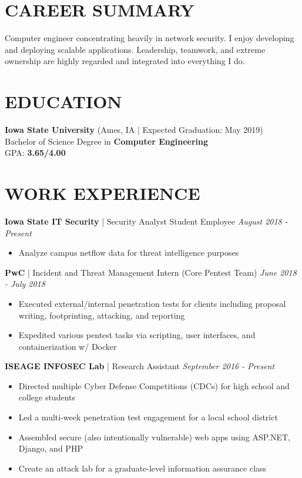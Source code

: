 \documentclass[line]{res}
\begin{document}
\address{(630) 450-0012\\dlimanow@iastate.edu\\Ames, Iowa}

\begin{resume}
\section{CAREER SUMMARY}
Computer engineer concentrating heavily in network security. I enjoy developing and deploying scalable applications. Leadership, teamwork, and extreme ownership are highly regarded and integrated into everything I do.

\section{EDUCATION}
\textbf{Iowa State University} (Ames, IA | Expected Graduation: May 2019)\\
Bachelor of Science Degree in \textbf{Computer Engineering}\\
GPA: \textbf{3.65/4.00}

\section{WORK EXPERIENCE}
\textbf{Iowa State IT Security} | Security Analyst Student Employee \hfill \textit{August 2018 - Present}
\begin{itemize}
	\item Analyze campus netflow data for threat intelligence purposes
\end{itemize}
\textbf{PwC} | Incident and Threat Management Intern (Core Pentest Team) \hfill \textit{June 2018 - July 2018}
\begin{itemize}
	\item Executed external/internal penetration tests for clients including proposal writing, footprinting, attacking, and reporting
	\item Expedited various pentest tasks via scripting, user interfaces, and containerization w/ Docker
\end{itemize}

\textbf{ISEAGE INFOSEC Lab} | Research Assistant \hfill \textit{September 2016 - Present}
\begin{itemize}
	\item Directed multiple Cyber Defense Competitions (CDCs) for high school and college students
	\item Led a multi-week penetration test engagement for a local school district
	\item Assembled secure (also intentionally vulnerable) web apps using ASP.NET, Django, and PHP
	\item Create an attack lab for a graduate-level information assurance class
\end{itemize}


\end{resume}
\end{document}
